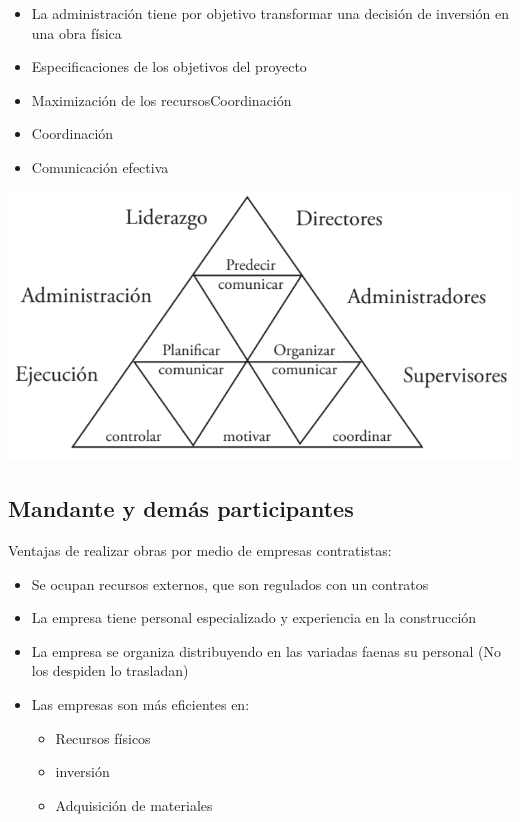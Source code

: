 \documentclass{article} %
\begin{document}
\begin{minipage}{0.45\textwidth}
    \begin{itemize}
        \item La administración tiene por objetivo transformar una decisión de inversión en una obra física
        \item Especificaciones de los objetivos del proyecto
        \item Maximización de los recursosCoordinación
        \item Coordinación
        \item Comunicación efectiva
    \end{itemize}
\end{minipage}
\hfill
\begin{minipage}{0.5\textwidth}
    \centering
    \includegraphics[width=1.2\textwidth]{piramide_administracion.png}
\end{minipage}

\subsection{Mandante y demás participantes}
Ventajas de realizar obras por medio de empresas contratistas:
\begin{itemize}
    \item Se ocupan recursos externos, que son regulados con un contratos
    \item La empresa tiene personal especializado y experiencia en la construcción
    \item La empresa se organiza distribuyendo en las variadas faenas su personal (No los despiden lo trasladan)
    \item Las empresas son más eficientes en:
    \begin{itemize}
        \item Recursos físicos
        \item inversión 
        \item Adquisición de materiales
    \end{itemize}
\end{itemize}
\end{document}
